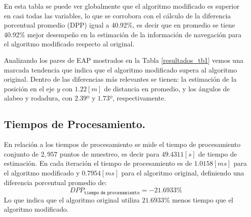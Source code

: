 \documentclass[conference]{IEEEtran}
\begin{document}
En esta tabla se puede ver globalmente que el algoritmo modificado es superior en casi todas las variables, lo que se corrobora con el cálculo de la diferencia porcentual promedio (DPP) igual a 40.92\%, es decir que en promedio se tiene 40.92\% mejor desempeño en la estimación de la información de navegación para el algoritmo modificado respecto al original.\par
Analizando los pares de EAP mostrados en la Tabla \ref{resultados_tb1} vemos una marcada tendencia que indica que el algoritmo modificado supera al algoritmo original. Dentro de las diferencias más relevantes se tienen: la estimación de la posición en el eje $y$  con $1.22[m]$ de distancia en promedio, y los ángulos de alabeo y rodadura, con $2.39º$ y $1.73º$, respectivamente.
\subsection{Tiempos de Procesamiento.}
En relación a los tiempos de procesamiento se mide el tiempo de procesamiento conjunto de $2,957$ puntos de muestreo, es decir para $49.4311 [s]$ de tiempo de estimación. En cada iteración el tiempo de procesamiento es de $1.0158[ms]$ para el algoritmo modificado y $0.7954 [ms]$ para el algoritmo original, definiendo una diferencia porcentual promedio de:
\begin{equation}
DPP_{\texttt{tiempo de procesamiento}}=-21.6933\%
\end{equation}
Lo que indica que el algoritmo original utiliza $21.6933\%$ menos tiempo que el algoritmo modificado.
\end{document}
